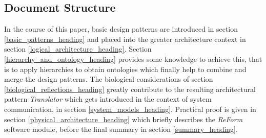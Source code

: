 %
%
%
%
%
%
%

\subsection{Document Structure}
\label{document_structure_heading}

In the course of this paper, basic design patterns are introduced in section
\ref{basic_patterns_heading} and placed into the greater architecture context
in section \ref{logical_architecture_heading}.
Section \ref{hierarchy_and_ontology_heading} provides some knowledge to achieve
this, that is to apply hierarchies to obtain ontologies which finally help to
combine and merge the design patterns.
The biological considerations of section \ref{biological_reflections_heading}
greatly contribute to the resulting architectural pattern \emph{Translator}
which gets introduced in the context of system communication, in section
\ref{system_models_heading}.
Practical proof is given in section \ref{physical_architecture_heading} which
briefly describes the \emph{ReForm} software module, before the final summary
in section \ref{summary_heading}.


